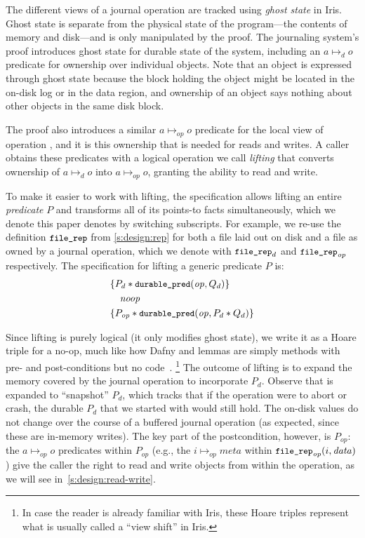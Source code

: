 The different views of a journal operation are tracked using \emph{ghost state} in Iris.  Ghost state is separate from
the physical state of the program---the contents of memory and disk---and is
only manipulated by the proof. The journaling system's proof introduces ghost
state for durable state of the system, including an $a \mapsto_{d} o$ predicate
for ownership over individual objects. Note that an object is expressed through
ghost state because the block holding the object might be located in the on-disk
log or in the data region, and ownership of an object says nothing about other
objects in the same disk block.

The proof also introduces a similar $a \mapsto_{\mathit{op}} o$ predicate for the local
view of operation , and it is this ownership that is needed for reads and
writes. A caller obtains these predicates with a logical operation we call
\emph{lifting} that converts ownership of $a \mapsto_{d} o$ into $a \mapsto_{\mathit{op}} o$, granting the
ability to read and write.


To make it easier to work with lifting, the specification allows lifting an
entire \emph{predicate} $P$ and transforms all of its points-to facts
simultaneously, which we denote this paper denotes by switching subscripts. For
example, we re-use
the definition $\cc{file_rep}$ from \autoref{s:design:rep} for both a file laid
out on disk and a file as owned by a journal operation, which we denote with
$\cc{file_rep}_{d}$ and $\cc{file_rep}_{\mathit{op}}$ respectively. The specification
for lifting a generic predicate $P$ is:
%
\begin{align*}
  \hoareV{P_d \sep \bufobjDurable(\mathit{op}, Q_d)}{\SKIP}{P_{\mathit{op}} \sep \bufobjDurable(\mathit{op}, P_d \sep Q_d)}
\end{align*}

Since lifting is purely logical (it only modifies ghost state), we
write it as a Hoare triple for a no-op, much like how Dafny and \fstar lemmas
are simply methods with pre- and post-conditions but no code~\cite[\S 12.2.3]{dafny-refman}.%
\footnote{In case the reader is already familiar with Iris, these Hoare triples represent
what is usually called a ``view shift'' in Iris.}
The outcome of lifting is to expand the memory covered by the journal operation to
incorporate $P_{d}$. Observe that \bufobjDurable is expanded to ``snapshot''
$P_{d}$, which tracks that if the operation were to abort or crash, the
durable $P_d$ that we started with would still hold.  The on-disk values
do not change over the course of a buffered journal operation (as expected, since these are
in-memory writes). The key part of the postcondition, however, is $P_{op}$: the
$a \mapsto_{op} o$ predicates within $P_{op}$ (e.g., the
$i \mapsto_{\mathit{op}} \mathit{meta}$ within $\cc{file_rep}_{\mathit{op}}(i, \mathit{data})$)
give the caller
the right to read and write objects from within the operation, as we will see
in~\autoref{s:design:read-write}.

